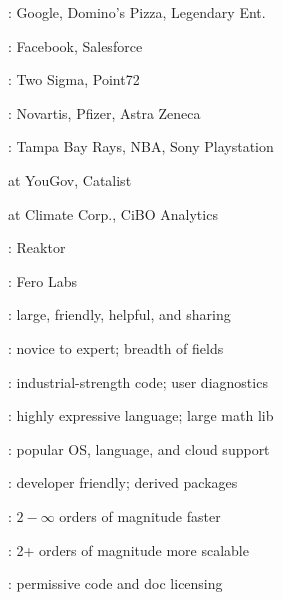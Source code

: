 \documentclass[10pt]{report}
\begin{document}
\begin{subitemize}
\item {}: Google, Domino's Pizza, Legendary Ent.
\item {}: Facebook, Salesforce
\item {}: Two Sigma, Point72
\item {}: Novartis, Pfizer, Astra Zeneca
\item {}: Tampa Bay Rays, NBA, Sony Playstation
\item {} at YouGov, Catalist
\item {} at Climate Corp., CiBO Analytics
\item {}: Reaktor
\item {}: Fero Labs
\end{subitemize}


\begin{subitemize}
\item {}: large, friendly, helpful, and sharing
\item {}:  novice to expert; breadth of fields
\item {}:  industrial-strength code; user diagnostics
\item {}:  highly expressive language;  large math lib
\item {}: popular OS, language, and cloud support
\item {}: developer friendly; derived packages
\item {}:  $2-\infty$ orders of magnitude faster
\item {}:  2+ orders of magnitude more scalable
\item {}: permissive code and doc licensing
\end{subitemize}

\end{document}
